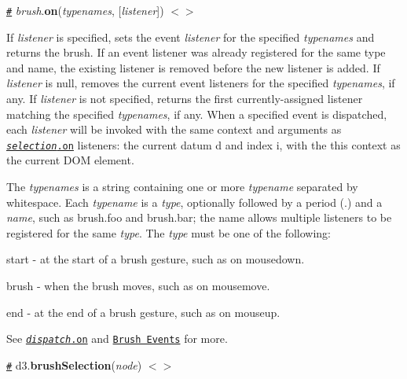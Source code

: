 \href{#brush_on}{\tt \#} {\itshape brush}.{\bfseries on}({\itshape typenames}, \mbox{[}{\itshape listener}\mbox{]}) \href{https://github.com/d3/d3-brush/blob/master/src/brush.js#L533}{\tt $<$$>$}

If {\itshape listener} is specified, sets the event {\itshape listener} for the specified {\itshape typenames} and returns the brush. If an event listener was already registered for the same type and name, the existing listener is removed before the new listener is added. If {\itshape listener} is null, removes the current event listeners for the specified {\itshape typenames}, if any. If {\itshape listener} is not specified, returns the first currently-\/assigned listener matching the specified {\itshape typenames}, if any. When a specified event is dispatched, each {\itshape listener} will be invoked with the same context and arguments as \href{https://github.com/d3/d3-selection#selection_on}{\tt {\itshape selection}.on} listeners\+: the current datum {\ttfamily d} and index {\ttfamily i}, with the {\ttfamily this} context as the current D\+OM element.

The {\itshape typenames} is a string containing one or more {\itshape typename} separated by whitespace. Each {\itshape typename} is a {\itshape type}, optionally followed by a period ({\ttfamily .}) and a {\itshape name}, such as {\ttfamily brush.\+foo} and {\ttfamily brush.\+bar}; the name allows multiple listeners to be registered for the same {\itshape type}. The {\itshape type} must be one of the following\+:


\begin{DoxyItemize}
\item {\ttfamily start} -\/ at the start of a brush gesture, such as on mousedown.
\item {\ttfamily brush} -\/ when the brush moves, such as on mousemove.
\item {\ttfamily end} -\/ at the end of a brush gesture, such as on mouseup.
\end{DoxyItemize}

See \href{https://github.com/d3/d3-dispatch#dispatch_on}{\tt {\itshape dispatch}.on} and \href{#brush-events}{\tt Brush Events} for more.

\href{#brushSelection}{\tt \#} d3.{\bfseries brush\+Selection}({\itshape node}) \href{https://github.com/d3/d3-brush/blob/master/src/brush.js#L118}{\tt $<$$>$}

